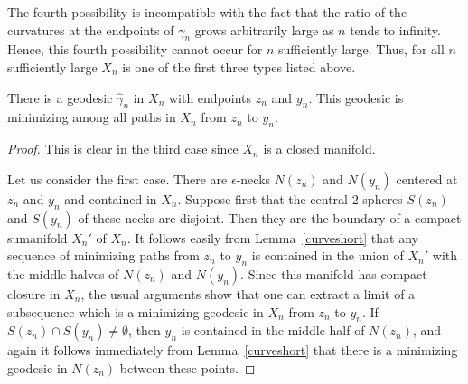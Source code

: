 The fourth possibility is incompatible with the fact that the ratio
of the curvatures at the endpoints of $\gamma_n$ grows arbitrarily
large as $n$ tends to infinity. Hence, this fourth possibility
cannot occur for $n$ sufficiently large. Thus, for all $n$
sufficiently large $X_n$ is one of the first three types listed
above.

\begin{claim}
\label{claim:minimizing-geodesic-in-Xn}
There is a geodesic $\hat\gamma_n$ in $X_n$ with endpoints $z_n$ and
$y_n$. This geodesic is minimizing among all paths in $X_n$ from
$z_n$ to $y_n$.
\end{claim}

\begin{proof}
This is clear in the third case since $X_n$ is a closed manifold.

Let us consider the first case. There are $\epsilon$-necks $N(z_n)$
and $N(y_n)$ centered at $z_n$ and $y_n$ and contained in $X_n$.
Suppose first that the central $2$-spheres $S(z_n)$ and $S(y_n)$ of
these necks are disjoint. Then they are the boundary of a compact
sumanifold $X_n'$ of $X_n$. It follows easily from
Lemma~\ref{curveshort} that any sequence of minimizing paths from
$z_n$ to $y_n$ is contained in the union of $X_n'$ with the  middle
halves of $N(z_n)$ and $N(y_n)$. Since this manifold has compact
closure in $X_n$, the usual arguments show that one can extract a
limit of a subsequence which is a minimizing geodesic in $X_n$ from
$z_n$ to $y_n$. If $S(z_n)\cap S(y_n)\not=\emptyset$, then $y_n$ is
contained in the middle half of $N(z_n)$, and again it follows
immediately from Lemma~\ref{curveshort} that there is a minimizing
geodesic in $N(z_n)$ between these points.


\end{proof}
